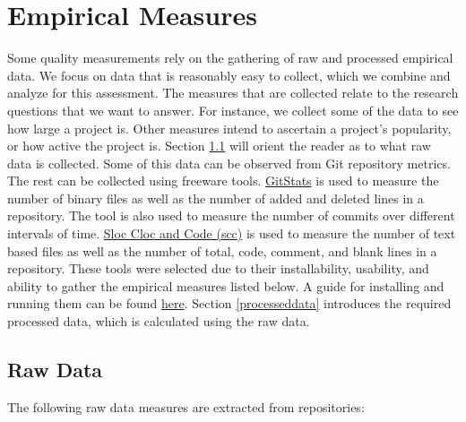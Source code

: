 \documentclass[letterpaper,cleveref]{lipics-v2019}
\theoremstyle{definition}
\begin{document}
\section{Empirical Measures} \label{SecEmpiricalMeasures}

Some quality measurements rely on the gathering of raw and processed empirical
data. We focus on data that is reasonably easy to collect, which we combine and
analyze for this assessment. The measures that are collected relate to the
research questions that we want to answer. For instance, we collect some of the
data to see how large a project is. Other measures intend to ascertain a
project’s popularity, or how active the project is.  Section \ref{rawdata} will
orient the reader as to what raw data is collected.  Some of this data can be
observed from Git repository metrics. The rest can be collected using freeware
tools. \href{https://github.com/tomgi/git_stats}{GitStats} is used to measure
the number of binary files as well as the number of added and deleted lines in a
repository. The tool is also used to measure the number of commits over
different intervals of time. \href{https://github.com/boyter/scc}{Sloc Cloc and
  Code (scc)} is used to measure the number of text based files as well as the
number of total, code, comment, and blank lines in a repository. These tools
were selected due to their installability, usability, and ability to gather the
empirical measures listed below. A guide for installing and running them can be
found
\href{https://github.com/smiths/AIMSS/blob/master/StateOfPractice/Methodology/A
  Guide to Empirical Measures.pdf} {here}. Section \ref{processeddata}
introduces the required processed data, which is calculated using the raw data.

\subsection{Raw Data}\label{rawdata}

The following raw data measures are extracted from repositories:
\end{document}
